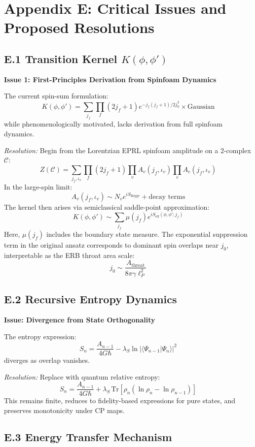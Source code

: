 \section*{Appendix E: Critical Issues and Proposed Resolutions}

\subsection*{E.1 Transition Kernel $K(\phi, \phi')$}

\textbf{Issue 1: First-Principles Derivation from Spinfoam Dynamics}

The current spin-sum formulation:
\[
K(\phi, \phi') = \sum_{j_f} \prod_f (2j_f+1) e^{-j_f(j_f+1)/2j_0^2} \times \text{Gaussian}
\]
while phenomenologically motivated, lacks derivation from full spinfoam dynamics.

\textit{Resolution:}  
Begin from the Lorentzian EPRL spinfoam amplitude on a 2-complex $\mathcal{C}$:
\[
Z(\mathcal{C}) = \sum_{j_f, \iota_v} \prod_f (2j_f + 1) \prod_v A_v(j_f, \iota_v) \prod_e A_e(j_f, \iota_v)
\]
In the large-spin limit:
\[
A_v(j_f, \iota_v) \sim N_v e^{i S_{\text{Regge}}} + \text{decay terms}
\]
The kernel then arises via semiclassical saddle-point approximation:
\[
K(\phi, \phi') \sim \sum_{j_f} \mu(j_f) e^{i S_{\text{eff}}(\phi, \phi'; j_f)}
\]
Here, $\mu(j_f)$ includes the boundary state measure. The exponential suppression term in the original ansatz corresponds to dominant spin overlaps near $j_0$, interpretable as the ERB throat area scale:
\[
j_0 \sim \frac{A_{\text{throat}}}{8\pi \gamma \ell_P^2}
\]

\subsection*{E.2 Recursive Entropy Dynamics}

\textbf{Issue: Divergence from State Orthogonality}

The entropy expression:
\[
S_n = \frac{A_{n-1}}{4G\hbar} - \lambda_S \ln |\langle \Psi_{n-1} | \Psi_n \rangle|^2
\]
diverges as overlap vanishes.

\textit{Resolution:}  
Replace with quantum relative entropy:
\[
S_n = \frac{A_{n-1}}{4G\hbar} + \lambda_S \, \mathrm{Tr}\left[\rho_n (\ln \rho_n - \ln \rho_{n-1})\right]
\]
This remains finite, reduces to fidelity-based expressions for pure states, and preserves monotonicity under CP maps.

\subsection*{E.3 Energy Transfer Mechanism}


